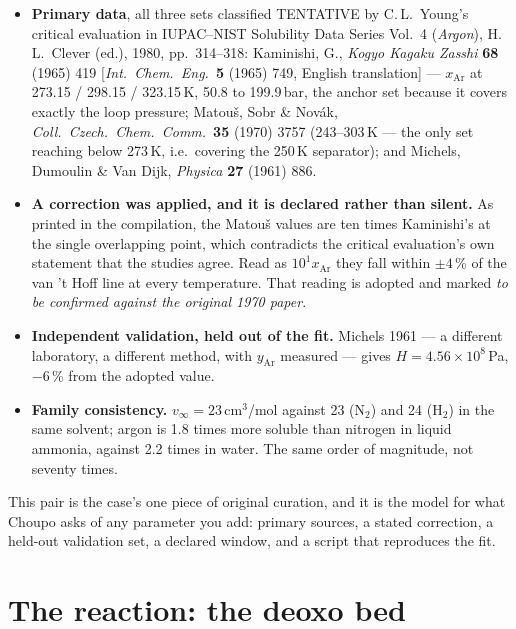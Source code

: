 \documentclass[11pt,a4paper]{article}
\begin{document}
\begin{itemize}[leftmargin=*]
\item \textbf{Primary data}, all three sets classified TENTATIVE by
      C.\,L.\ Young's critical evaluation in IUPAC--NIST Solubility Data
      Series Vol.~4 (\emph{Argon}), H.\,L.\ Clever (ed.), 1980, pp.~314--318:
      Kaminishi, G., \emph{Kogyo Kagaku Zasshi} \textbf{68} (1965) 419
      [\emph{Int.\ Chem.\ Eng.}\ \textbf{5} (1965) 749, English translation]
      --- $x_{\mathrm{Ar}}$ at 273.15 / 298.15 / 323.15\,K, 50.8 to
      199.9\,bar, the anchor set because it covers exactly the loop pressure;
      Matou\v{s}, Sobr \& Nov\'ak, \emph{Coll.\ Czech.\ Chem.\ Comm.}\
      \textbf{35} (1970) 3757 (243--303\,K --- the only set reaching below
      273\,K, i.e.\ covering the 250\,K separator); and Michels, Dumoulin
      \& Van Dijk, \emph{Physica} \textbf{27} (1961) 886.
\item \textbf{A correction was applied, and it is declared rather than
      silent.} As printed in the compilation, the Matou\v{s} values are ten
      times Kaminishi's at the single overlapping point, which contradicts the
      critical evaluation's own statement that the studies agree. Read as
      $10^{1}x_{\mathrm{Ar}}$ they fall within $\pm4$\,\% of the van 't Hoff
      line at every temperature. That reading is adopted and marked \emph{to be
      confirmed against the original 1970 paper}.
\item \textbf{Independent validation, held out of the fit.} Michels 1961 ---
      a different laboratory, a different method, with $y_{\mathrm{Ar}}$
      measured --- gives $H = 4.56\times10^{8}$\,Pa, $-6$\,\% from the adopted
      value.
\item \textbf{Family consistency.} $v_\infty = 23$\,cm$^3$/mol against 23
      (N$_2$) and 24 (H$_2$) in the same solvent; argon is 1.8 times more
      soluble than nitrogen in liquid ammonia, against 2.2 times in water.
      The same order of magnitude, not seventy times.
\end{itemize}

This pair is the case's one piece of original curation, and it is the model for
what Choupo asks of any parameter you add: primary sources, a stated
correction, a held-out validation set, a declared window, and a script that
reproduces the fit.

\section{The reaction: the deoxo bed}
\end{document}
